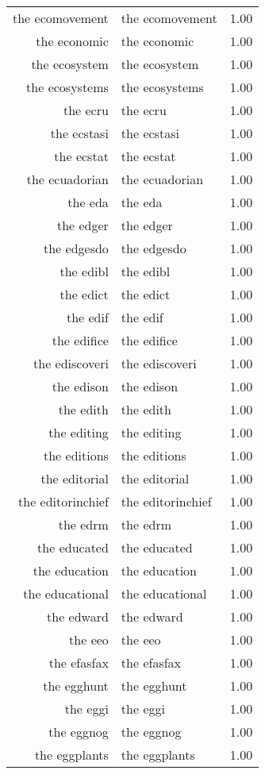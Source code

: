 \begin{table}[ht]
\begin{tabular}{rlr}
  the ecomovement & the ecomovement & 1.00 \\ 
  the economic & the economic & 1.00 \\ 
  the ecosystem & the ecosystem & 1.00 \\ 
  the ecosystems & the ecosystems & 1.00 \\ 
  the ecru & the ecru & 1.00 \\ 
  the ecstasi & the ecstasi & 1.00 \\ 
  the ecstat & the ecstat & 1.00 \\ 
  the ecuadorian & the ecuadorian & 1.00 \\ 
  the eda & the eda & 1.00 \\ 
  the edger & the edger & 1.00 \\ 
  the edgesdo & the edgesdo & 1.00 \\ 
  the edibl & the edibl & 1.00 \\ 
  the edict & the edict & 1.00 \\ 
  the edif & the edif & 1.00 \\ 
  the edifice & the edifice & 1.00 \\ 
  the ediscoveri & the ediscoveri & 1.00 \\ 
  the edison & the edison & 1.00 \\ 
  the edith & the edith & 1.00 \\ 
  the editing & the editing & 1.00 \\ 
  the editions & the editions & 1.00 \\ 
  the editorial & the editorial & 1.00 \\ 
  the editorinchief & the editorinchief & 1.00 \\ 
  the edrm & the edrm & 1.00 \\ 
  the educated & the educated & 1.00 \\ 
  the education & the education & 1.00 \\ 
  the educational & the educational & 1.00 \\ 
  the edward & the edward & 1.00 \\ 
  the eeo & the eeo & 1.00 \\ 
  the efasfax & the efasfax & 1.00 \\ 
  the egghunt & the egghunt & 1.00 \\ 
  the eggi & the eggi & 1.00 \\ 
  the eggnog & the eggnog & 1.00 \\ 
  the eggplants & the eggplants & 1.00 \\ 

\end{tabular}
\end{table}

